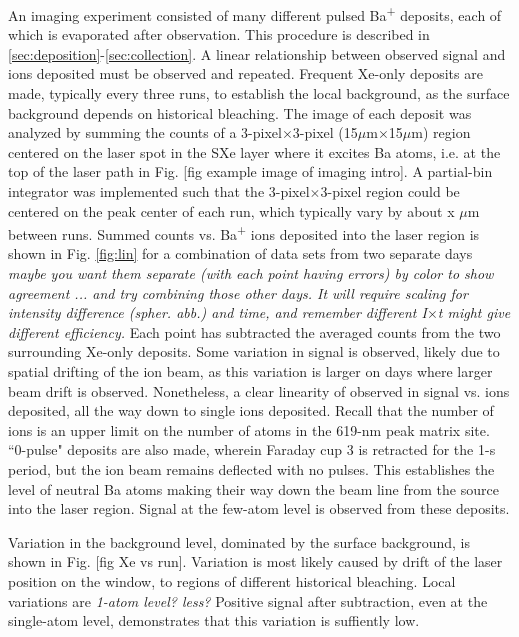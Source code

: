 An imaging experiment consisted of many different pulsed Ba\textsuperscript{+} deposits, each of which is evaporated after observation.  This procedure is described in \ref{sec:deposition}-\ref{sec:collection}.  A linear relationship between observed signal and ions deposited must be observed and repeated.  Frequent Xe-only deposits are made, typically every three runs, to establish the local background, as the surface background depends on historical bleaching.  The image of each deposit was analyzed by summing the counts of a 3-pixel$\times$3-pixel (15$\mu$m$\times$15$\mu$m) region centered on the laser spot in the SXe layer where it excites Ba atoms, i.e. at the top of the laser path in Fig. [fig example image of imaging intro].  A partial-bin integrator was implemented such that the 3-pixel$\times$3-pixel region could be centered on the peak center of each run, which typically vary by about {\color{red}x} $\mu$m between runs.  Summed counts vs. Ba\textsuperscript{+} ions deposited into the laser region is shown in Fig. \ref{fig:lin} for a combination of data sets from {\color{red}two} separate days \emph{\color{gray}maybe you want them separate (with each point having errors) by color to show agreement ... and try combining those other days.  It will require scaling for intensity difference (spher. abb.) and time, and remember different I$\times$t might give different efficiency.}  Each point has subtracted the averaged counts from the two surrounding Xe-only deposits.  Some variation in signal is observed, likely due to spatial drifting of the ion beam, as this variation is larger on days where larger beam drift is observed.  Nonetheless, a clear linearity of observed in signal vs. ions deposited, all the way down to single ions deposited.  Recall that the number of ions is an upper limit on the number of atoms in the 619-nm peak matrix site.  ``0-pulse" deposits are also made, wherein Faraday cup 3 is retracted for the 1-s period, but the ion beam remains deflected with no pulses.  This establishes the level of neutral Ba atoms making their way down the beam line from the source into the laser region.  Signal at the few-atom level is observed from these deposits.

Variation in the background level, dominated by the surface background, is shown in Fig. [fig Xe vs run].  Variation is most likely caused by drift of the laser position on the window, to regions of different historical bleaching.  Local variations are \emph{\color{gray}1-atom level?  less?}  Positive signal after subtraction, even at the single-atom level, demonstrates that this variation is suffiently low.

